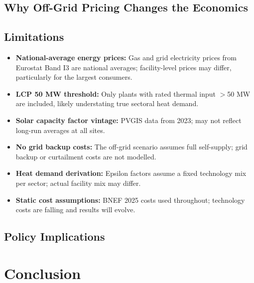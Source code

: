 \documentclass[12pt, a4paper]{article}
\begin{document}
\subsection{Why Off-Grid Pricing Changes the Economics}

\subsection{Limitations}
\begin{itemize}
  \item \textbf{National-average energy prices:} Gas and grid electricity
        prices from Eurostat Band I3 are national averages; facility-level
        prices may differ, particularly for the largest consumers.
  \item \textbf{LCP 50 MW threshold:} Only plants with rated thermal input
        $>$50 MW are included, likely understating true sectoral heat demand.
  \item \textbf{Solar capacity factor vintage:} PVGIS data from 2023; may
        not reflect long-run averages at all sites.
  \item \textbf{No grid backup costs:} The off-grid scenario assumes
        full self-supply; grid backup or curtailment costs are not modelled.
  \item \textbf{Heat demand derivation:} Epsilon factors assume a fixed
        technology mix per sector; actual facility mix may differ.
  \item \textbf{Static cost assumptions:} BNEF 2025 costs used throughout;
        technology costs are falling and results will evolve.
\end{itemize}

\subsection{Policy Implications}

\section{Conclusion}
\label{sec:conclusion}
\end{document}

